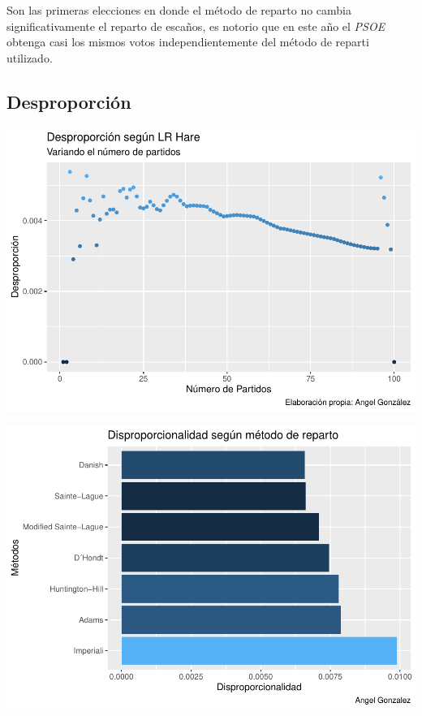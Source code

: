 \documentclass[12pt,a4paper,]{book}
\numberwithin{dummy}{section}
\theoremstyle{ocrenumbox}
\theoremstyle{blacknumex}
\theoremstyle{blacknumbox}
\theoremstyle{ocrenum}
\theoremstyle{ocrenum}
\begin{document}
Son las primeras elecciones en donde el método de reparto no cambia
significativamente el reparto de escaños, es notorio que en este año el
\emph{PSOE} obtenga casi los mismos votos independientemente del método
de reparti utilizado.

\hypertarget{desproporciuxf3n-12}{%
\subsection{Desproporción}\label{desproporciuxf3n-12}}

\begin{center}\includegraphics[width=1\linewidth]{figurasR/unnamed-chunk-42-1} \end{center}

\begin{center}\includegraphics[width=1\linewidth]{figurasR/unnamed-chunk-42-2} \end{center}
\end{document}
